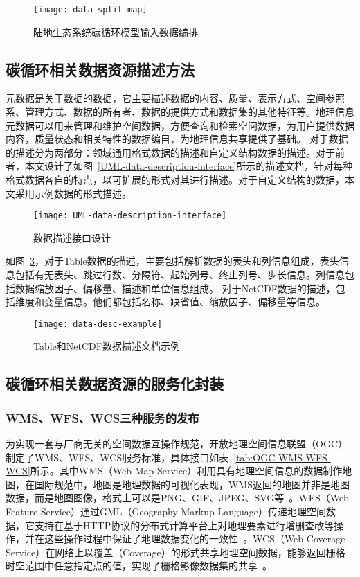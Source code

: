 \begin{figure}[!htbp]
    \centering
    \texttt{[image: data-split-map]}
    \caption{陆地生态系统碳循环模型输入数据编排}
    \label{fig:data-split-map}
\end{figure}

\subsection{碳循环相关数据资源描述方法}
\label{sec:data-desc}
元数据是关于数据的数据，它主要描述数据的内容、质量、表示方式、空间参照系、管理方式、数据的所有者、数据的提供方式和数据集的其他特征等。地理信息元数据可以用来管理和维护空间数据，方便查询和检索空问数据，为用户提供数据内容，质量状态和相关特性的数据编目，为地理信息共享提供了基础。
对于数据的描述分为两部分：领域通用格式数据的描述和自定义结构数据的描述。对于前者，本文设计了如图~\ref{UML-data-description-interface}所示的描述文档，针对每种格式数据各自的特点，以可扩展的形式对其进行描述。对于自定义结构的数据，本文采用示例数据的形式描述。

\begin{figure}[!htbp]
    \centering
    \texttt{[image: UML-data-description-interface]}
    \caption{数据描述接口设计}
    \label{fig:UML-data-description-interface}
\end{figure}

如图~\ref{fig:data-desc-example}，对于Table数据的描述，主要包括解析数据的表头和列信息组成，表头信息包括有无表头、跳过行数、分隔符、起始列号、终止列号、步长信息。列信息包括数据缩放因子、偏移量、描述和单位信息组成。
对于NetCDF数据的描述，包括维度和变量信息。他们都包括名称、缺省值、缩放因子、偏移量等信息。

\begin{figure}[!htbp]
    \centering
    \texttt{[image: data-desc-example]}
    \caption{Table和NetCDF数据描述文档示例}
    \label{fig:data-desc-example}
\end{figure}

\subsection{碳循环相关数据资源的服务化封装}
\subsubsection{WMS、WFS、WCS三种服务的发布}
为实现一套与厂商无关的空间数据互操作规范，开放地理空间信息联盟（OGC）制定了WMS、WFS、WCS服务标准，具体接口如表~\ref{tab:OGC-WMS-WFS-WCS}所示。其中WMS（Web Map Service）利用具有地理空间信息的数据制作地图，在国际规范中，地图是地理数据的可视化表现，WMS返回的地图并非是地图数据，而是地图图像，格式上可以是PNG、GIF、JPEG、SVG等~\cite{OGC-WMS}。WFS（Web Feature Service）通过GML（Geography Markup Language）传递地理空间数据，它支持在基于HTTP协议的分布式计算平台上对地理要素进行增删查改等操作，并在这些操作过程中保证了地理数据变化的一致性~\cite{OGC-WFS}。WCS（Web Coverage Service）在网络上以覆盖（Coverage）的形式共享地理空间数据，能够返回栅格时空范围中任意指定点的值，实现了栅格影像数据集的共享~\cite{OGC-WCS}。

